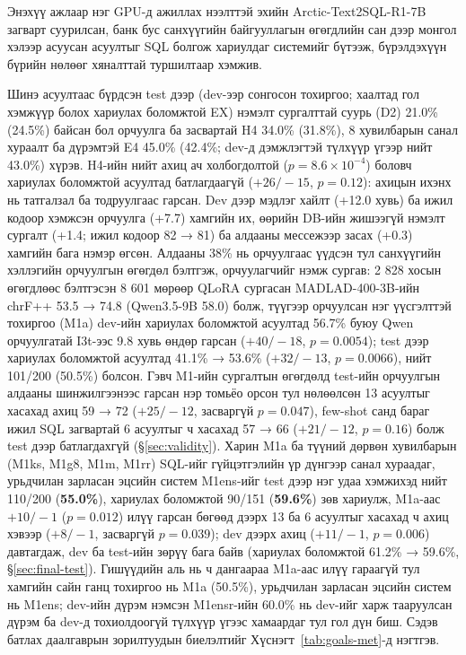 
{}
\label{ch:conclusion}
\pagecolor{white}

Энэхүү ажлаар нэг GPU-д ажиллах нээлттэй эхийн Arctic-Text2SQL-R1-7B загварт суурилсан, банк бус санхүүгийн
байгууллагын өгөгдлийн сан дээр монгол хэлээр асуусан асуултыг SQL болгож хариулдаг системийг бүтээж, бүрэлдэхүүн бүрийн
нөлөөг хяналттай туршилтаар хэмжив.

Шинэ асуултаас бүрдсэн test дээр (dev-ээр сонгосон тохиргоо; хаалтад гол хэмжүүр болох хариулах боломжтой EX) нэмэлт
сургалттай суурь (D2) 21.0\% (24.5\%) байсан бол орчуулга ба засвартай H4 34.0\% (31.8\%), 8 хувилбарын санал хураалт ба
дүрэмтэй E4 45.0\% (42.4\%; dev-д дэмжлэгтэй түлхүүр үгээр нийт 43.0\%) хүрэв. H4-ийн нийт ахиц ач холбогдолтой
($p = 8.6\times10^{-4}$) боловч хариулах боломжтой асуултад батлагдаагүй ($+26/-15$, $p = 0.12$): ахицын ихэнх нь татгалзал
ба тодруулгаас гарсан. Dev дээр мэдлэг хайлт (+12.0 хувь) ба ижил кодоор хэмжсэн орчуулга (+7.7) хамгийн их, өөрийн DB-ийн
жишээгүй нэмэлт сургалт (+1.4; ижил кодоор 82 → 81) ба алдааны мессежээр засах (+0.3) хамгийн бага нэмэр өгсөн. Алдааны
38\% нь орчуулгаас үүдсэн тул санхүүгийн хэллэгийн орчуулгын өгөгдөл бэлтгэж, орчуулагчийг нэмж сургав: 2 828 хосын
өгөгдлөөс бэлтгэсэн 8 601 мөрөөр QLoRA сургасан MADLAD-400-3B-ийн chrF++ 53.5 → 74.8 (Qwen3.5-9B 58.0) болж, түүгээр
орчуулсан нэг үүсгэлттэй тохиргоо (M1a) dev-ийн хариулах боломжтой асуултад 56.7\% буюу Qwen орчуулгатай I3t-ээс 9.8 хувь
өндөр гарсан ($+40/-18$, $p = 0.0054$); test дээр хариулах боломжтой асуултад 41.1\% → 53.6\% ($+32/-13$, $p = 0.0066$),
нийт 101/200 (50.5\%) болсон. Гэвч M1-ийн сургалтын өгөгдөлд test-ийн орчуулгын алдааны шинжилгээнээс гарсан нэр томьёо
орсон тул нөлөөлсөн 13 асуултыг хасахад ахиц 59 → 72 ($+25/-12$, засваргүй $p = 0.047$), few-shot санд бараг ижил SQL
загвартай 6 асуултыг ч хасахад 57 → 66 ($+21/-12$, $p = 0.16$) болж test дээр батлагдахгүй (§\ref{sec:validity}). Харин
M1a ба түүний дөрвөн хувилбарын (M1ks, M1g8, M1m, M1rr) SQL-ийг гүйцэтгэлийн үр дүнгээр санал хураадаг,
урьдчилан зарласан эцсийн систем M1ens-ийг test дээр нэг удаа хэмжихэд нийт 110/200 (\textbf{55.0\%}), хариулах боломжтой
90/151 (\textbf{59.6\%}) зөв хариулж, M1a-аас $+10/-1$ ($p = 0.012$) илүү гарсан бөгөөд дээрх 13 ба 6 асуултыг хасахад ч
ахиц хэвээр ($+8/-1$, засваргүй $p = 0.039$); dev дээрх ахиц ($+11/-1$, $p = 0.006$) давтагдаж, dev ба test-ийн зөрүү бага
байв (хариулах боломжтой 61.2\% → 59.6\%, §\ref{sec:final-test}). Гишүүдийн аль нь ч дангаараа M1a-аас илүү гараагүй тул
хамгийн сайн ганц тохиргоо нь M1a (50.5\%), урьдчилан зарласан эцсийн систем нь M1ens; dev-ийн дүрэм нэмсэн M1ensr-ийн
60.0\% нь dev-ийг харж тааруулсан дүрэм ба dev-д тохиолдоогүй түлхүүр үгээс хамаардаг тул гол дүн биш. Сэдэв
батлах даалгаврын зорилтуудын биелэлтийг Хүснэгт~\ref{tab:goals-met}-д нэгтгэв.

